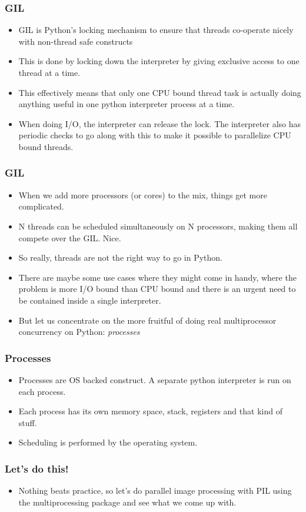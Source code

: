 \documentclass[13pt,xcolor=dvipsnames]{beamer}
\begin{document}
\begin{frame}
    \frametitle{GIL}
    \begin{itemize}
        \item GIL is Python's locking mechanism to ensure that threads co-operate nicely with non-thread safe constructs 
        \pause
        \item This is done by locking down the interpreter by giving exclusive access to one thread at a time.
        \pause
        \item This effectively means that only one CPU bound thread task is actually doing anything useful in one
            python interpreter process at a time.
        \pause
        \item When doing I/O, the interpreter can release the lock. The interpreter also has periodic checks to go along
            with this to make it possible to parallelize CPU bound threads.
    \end{itemize}
\end{frame}

\begin{frame}
    \frametitle{GIL}
    \begin{itemize}
        \item When we add more processors (or cores) to the mix, things get more complicated.
        \pause
        \item N threads can be scheduled simultaneously on N processors, making them all compete over the GIL. Nice.
        \pause
        \item So really, threads are not the right way to go in Python.
        \pause
        \item There are maybe some use cases where they might come in handy, where the problem is more I/O bound than CPU
            bound and there is an urgent need to be contained inside a single interpreter.
        \pause
        \item But let us concentrate on the more fruitful of doing real multiprocessor concurrency on Python: \emph{processes}
    \end{itemize}
\end{frame}

\begin{frame}
    \frametitle{Processes}
    \begin{itemize}
        \item Processes are OS backed construct. A separate python interpreter is run on each process.
        \pause
        \item Each process has its own memory space, stack, registers and that kind of stuff.
        \pause
        \item Scheduling is performed by the operating system.
    \end{itemize}
\end{frame}

\begin{frame}
    \frametitle{Let's do this!}
    \begin{itemize}
        \item Nothing beats practice, so let's do parallel image processing with PIL using the multiprocessing package
            and see what we come up with. 
    \end{itemize}
\end{frame}
\end{document}
